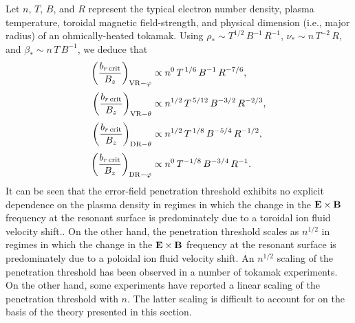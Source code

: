 \documentclass[12pt,prb,aps]{revtex4-1}
\begin{document}
Let $n$, $T$, $B$, and $R$ represent the typical electron number density, plasma temperature, toroidal magnetic field-strength,
and physical dimension (i.e., major radius) of an ohmically-heated tokamak. Using $\rho_\ast\sim T^{1/2}\,B^{-1}\,R^{-1}$, 
$\nu_\ast\sim n\,T^{-2}\,R$, and $\beta_\ast\sim n\,T\,B^{-1}$,
we deduce that
\begin{align}
\left(\frac{b_{r\,{\rm crit}}}{B_z}\right)_{{\rm VR}-\varphi} &\propto n^{0}\,T^{\,1/6}\,B^{-1}\,R^{-7/6},\\[0.5ex]
\left(\frac{b_{r\,{\rm crit}}}{B_z}\right)_{{\rm VR}-\theta} &\propto n^{1/2}\,T^{\,5/12}\,B^{-3/2}\,R^{-2/3},\\[0.5ex]
\left(\frac{b_{r\,{\rm crit}}}{B_z}\right)_{{\rm DR}-\theta} &\propto n^{1/2}\,T^{\,1/8}\,B^{-5/4}\,R^{-1/2},\\[0.5ex]
\left(\frac{b_{r\,{\rm crit}}}{B_z}\right)_{{\rm DR}-\varphi} &\propto n^{0}\,T^{-1/8}\,B^{-3/4}\,R^{-1}.
\end{align}
It can be seen that the error-field penetration threshold exhibits no explicit dependence on the plasma
density in regimes in which the change in the ${\bf E}\times {\bf B}$ frequency at the resonant surface is predominately due to a toroidal ion fluid 
velocity shift.\cite{rf1998,cole}. On the other hand, the penetration threshold
scales as $n^{1/2}$ in regimes in which the change in the ${\bf E}\times{\bf B}$ frequency at the resonant surface is predominately due to a  poloidal ion fluid velocity shift. An $n^{1/2}$ scaling of the penetration threshold has been observed in a number of tokamak
experiments.\cite{hender,wang1,wang2,lazzaro,park} 
On the other hand, some experiments have reported a linear scaling of the penetration threshold with $n$.\cite{scoville,wolf,wolfe,howell,menard,buttery} The latter
scaling is difficult to account for on the basis of the theory presented in this section. 
\end{document}
